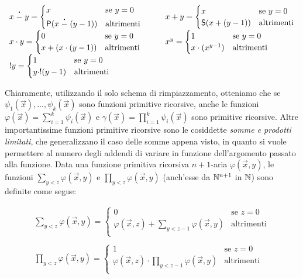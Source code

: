 \documentclass[runningheads,a4paper]{llncs}
\begin{document}
\[
\begin{array}{ll}
x\stackrel{\centerdot}{-} y = 
\begin{cases}
x & \mbox{se } y = 0 \\
\mathsf{P}(x\stackrel{\centerdot}{-}(y-1)) & \mbox{altrimenti} \\
\end{cases}
\qquad
&
x+y = 
\begin{cases}
x & \mbox{se } y = 0 \\
\mathsf{S}(x+(y-1)) & \mbox{altrimenti} \\
\end{cases}
\\
x \cdot y = 
\begin{cases}
0 & \mbox{se } y = 0 \\
x + (x\cdot (y-1)) & \mbox{altrimenti} \\
\end{cases}
&
x^y = 
\begin{cases}
1 & \mbox{se } y = 0 \\
x \cdot (x^{y-1}) & \mbox{altrimenti} \\
\end{cases}
\\
!y = 
\begin{cases}
1 & \mbox{se } y = 0 \\
y \cdot !(y-1) & \mbox{altrimenti} \\
\end{cases}
&
\end{array}
\]

Chiaramente, utilizzando il solo schema di rimpiazzamento, otteniamo che se $\psi_1(\vec x),\ldots,\psi_k(\vec x)$ sono funzioni primitive ricorsive, anche le funzioni $\varphi(\vec x) = \sum_{i=1}^{k} \psi_i(\vec x)$ e $\gamma(\vec x) = \prod_{i=1}^{k} \psi_i(\vec x)$ sono primitive ricorsive. Altre importantissime funzioni primitive ricorsive sono le cosiddette \emph{somme e prodotti limitati}, che generalizzano il caso delle somme appena visto, in quanto si vuole permettere al numero degli addendi di variare in funzione dell'argomento passato alla funzione. Data una funzione primitiva ricorsiva $n+1$-aria $\varphi(\vec x,y)$, le funzioni $\sum_{y < z} \varphi(\vec x,y)$ e $\prod_{y < z} \varphi(\vec x,y)$ (anch'esse da $\mathbb{N}^{n+1}$ in $\mathbb{N}$) sono definite come segue:

\[
\begin{array}{l}
\sum_{y < z} \varphi(\vec x,y) = 
\begin{cases}
0 & \mbox{se } z = 0 \\
\varphi(\vec x,z) + \sum_{y < z-1} \varphi(\vec x,y) & \mbox{altrimenti} \\
\end{cases}
\\
\qquad
\\
\prod_{y < z} \varphi(\vec x,y) = 
\begin{cases}
1 & \mbox{se } z = 0 \\
\varphi(\vec x,z) \cdot \prod_{y < z-1} \varphi(\vec x,y) & \mbox{altrimenti} \\
\end{cases}
\\
\end{array}
\]
\end{document}
